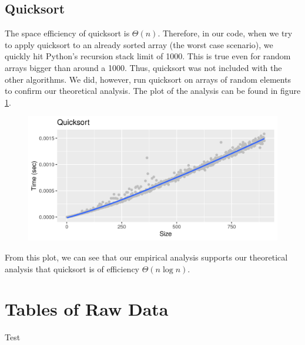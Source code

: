 \documentclass[letterpaper, 11pt]{article}
\begin{document}
\subsection{Quicksort}
The space efficiency of quicksort is \(\Theta(n)\). Therefore, in our code,
when we try to apply quicksort to an already sorted array (the worst case
scenario), we quickly hit Python's recursion stack limit of 1000. This is true
even for random arrays bigger than around a 1000. Thus, quicksort was not
included with the other algorithms. We did, however, run quicksort on arrays of
random elements to confirm our theoretical analysis. The plot of the analysis
can be found in figure \ref{fig:quick}. 

\begin{figure}[h]
  \includegraphics[width=\linewidth]{quick.png}
  \label{fig:quick}
\end{figure}

From this plot, we can see that our empirical analysis supports our theoretical
analysis that quicksort is of efficiency \(\Theta(n \log n)\). 

\appendix
\section{Tables of Raw Data}
Test
\end{document}
